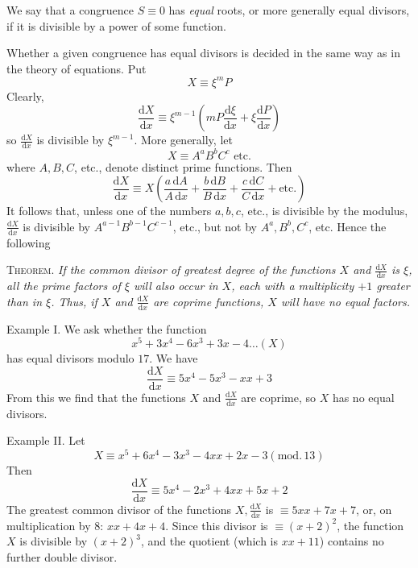 We say that a congruence $S\equiv0$ has \emph{equal} roots, or more generally equal divisors, if it is divisible by a power of some function.

Whether a given congruence has equal divisors is decided in the same way as in the theory of equations. Put
\[
X\equiv\xi^mP
\]
Clearly,
\[
\frac{\mathrm{d}X}{\mathrm{d}x}\equiv\xi^{m-1}\left(mP\frac{\mathrm{d}\xi}{\mathrm{d}x}+\xi\frac{\mathrm{d}P}{\mathrm{d}x}\right)
\]
so $\frac{\mathrm{d}X}{\mathrm{d}x}$ is divisible by $\xi^{m-1}$. More generally, let
\[
X\equiv A^aB^bC^c\text{ etc.}
\]
where $A,B,C$, etc., denote distinct prime functions. Then
\[
\frac{\mathrm{d}X}{\mathrm{d}x}\equiv X\left(\frac{a\,\mathrm{d}A}{A\,\mathrm{d}x}+\frac{b\,\mathrm{d}B}{B\,\mathrm{d}x}+\frac{c\,\mathrm{d}C}{C\,\mathrm{d}x}+\text{etc.}\right)
\]
It follows that, unless one of the numbers $a,b,c$, etc., is divisible by the modulus, $\frac{\mathrm{d}X}{\mathrm{d}x}$ is divisible by $A^{a-1}B^{b-1}C^{c-1}$, etc., but not by $A^a,B^b,C^c$, etc. Hence the following

\textsc{Theorem.} \emph{If the common divisor of greatest degree of the functions $X$ and $\frac{\mathrm{d}X}{\mathrm{d}x}$ is $\xi$, all the prime factors of $\xi$ will also occur in $X$, each with a multiplicity $+1$ greater than in $\xi$. Thus, if $X$ and $\frac{\mathrm{d}X}{\mathrm{d}x}$ are coprime functions, $X$ will have no equal factors.}

Example I. We ask whether the function
\[
x^5+3x^4-6x^3+3x-4\ldots(X)
\]
has equal divisors modulo $17$. We have
\[
\frac{\mathrm{d}X}{\mathrm{d}x}\equiv5x^4-5x^3-xx+3
\]
From this we find that the functions $X$ and $\frac{\mathrm{d}X}{\mathrm{d}x}$ are coprime, so $X$ has no equal divisors.

Example II. Let
\[
X\equiv x^5+6x^4-3x^3-4xx+2x-3(\mathrm{mod.}\,13)
\]
Then
\[
\frac{\mathrm{d}X}{\mathrm{d}x}\equiv5x^4-2x^3+4xx+5x+2
\]
The greatest common divisor of the functions $X,\frac{\mathrm{d}X}{\mathrm{d}x}$ is $\equiv5xx+7x+7$, or,
on multiplication by $8$: $xx+4x+4$. Since this divisor is $\equiv(x+2)^2$, the function $X$ is divisible by $(x+2)^3$, and the quotient (which is $xx+11$) contains no further double divisor.

